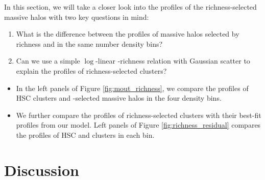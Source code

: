 \documentclass[a4paper,fleqn,usenatbib]{mnras}
\begin{document}
    In this section, we will take a closer look into the \dsigma{} profiles of the
    richness-selected massive halos with two key questions in mind:



    \begin{enumerate}

        \item What is the difference between the \dsigma{} profiles of massive halos selected 
            by richness and \mstar{} in the same number density bins?

        \item Can we use a simple $\log$-linear \mvir{}-richness relation with Gaussian 
            scatter to explain the \dsigma{} profiles of richness-selected clusters?

    \end{enumerate}


    \begin{itemize}

        \item In the left panels of Figure \ref{fig:mout_richness}, we compare the \dsigma{}
            profiles of HSC \redm{} clusters and -selected massive halos in the four
            density bins.
        
        \item We further compare the \dsigma{} profiles of richness-selected clusters
            with their best-fit profiles from our model.
            Left panels of Figure \ref{fig:richness_residual} compares the \dsigma{}
            profiles of HSC \redm{} and \camira{} clusters in each bin. 

    \end{itemize}
    
\section{Discussion}
    \label{sec:discussion}
\end{document}
